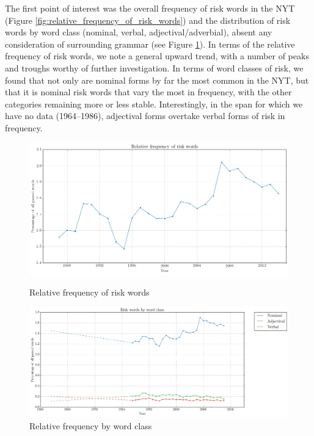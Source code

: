 The first point of interest was the overall frequency of risk words in the NYT (Figure \ref{fig:relative_frequency_of_risk_words}) and the distribution of risk words by word class (nominal, verbal, adjectival\slash adverbial), absent any consideration of surrounding grammar (see Figure \ref{fig:wordclasses}). In terms of the relative frequency of risk words, we note a general upward trend, with a number of peaks and troughs worthy of further investigation. In terms of word classes of risk, we found that not only are nominal forms by far the most common in the NYT, but that it is nominal risk words that vary the most in frequency, with the other categories remaining more or less stable. Interestingly, in the span for which we have no data (1964--1986), adjectival forms overtake verbal forms of risk in frequency.


\noindent
\begin{figure}[htb!]
\centering
\begin{minipage}{.45\textwidth}
\centering
\includegraphics[width=.95\textwidth]{../images/relative_frequency_of_risk_words.png}
\caption{Relative frequency of risk words}
\label{fig:relative_frequency_of_risk_words}
\end{minipage}%
\begin{minipage}{.55\textwidth}
\centering
\includegraphics[width=.95\textwidth]{../images/risk_words_by_word_class.png}
\caption{Relative frequency by word class}
\label{fig:wordclasses}
\end{minipage}
\end{figure}

